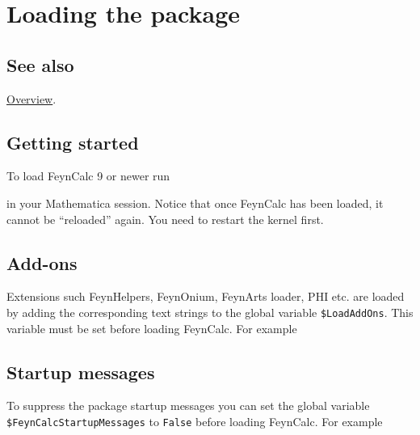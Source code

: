 \documentclass[../FeynCalcManual.tex]{subfiles}
\begin{document}
\hypertarget{loading the package}{
\section{Loading the package}\label{loading the package}}

\subsection{See also}

\hyperlink{toc}{Overview}.

\hypertarget{getting-started}{%
\subsection{Getting started}\label{getting-started}}

To load FeynCalc 9 or newer run

\begin{Shaded}
\begin{Highlighting}[]
\end{Highlighting}
\end{Shaded}

in your Mathematica session. Notice that once FeynCalc has been loaded,
it cannot be ``reloaded'' again. You need to restart the kernel first.

\hypertarget{add-ons}{%
\subsection{Add-ons}\label{add-ons}}

Extensions such FeynHelpers, FeynOnium, FeynArts loader, PHI etc. are
loaded by adding the corresponding text strings to the global variable
\texttt{\$LoadAddOns}. This variable must be set before loading
FeynCalc. For example

\begin{Shaded}
\begin{Highlighting}[]
\ExtensionTok{=}\OperatorTok{\{}\OperatorTok{,}\OperatorTok{\}}\NormalTok{;}
\end{Highlighting}
\end{Shaded}

\hypertarget{startup-messages}{%
\subsection{Startup messages}\label{startup-messages}}

To suppress the package startup messages you can set the global variable
\texttt{\$FeynCalcStartupMessages} to \texttt{False} before loading
FeynCalc. For example

\begin{Shaded}
\begin{Highlighting}[]
\ExtensionTok{=}\NormalTok{;}
\end{Highlighting}
\end{Shaded}
\end{document}
